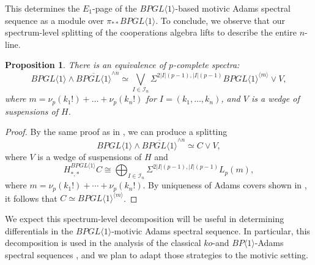 \documentclass{amsart}
\newtheorem{proposition}[theorem]{Proposition}
\theoremstyle{plain}
\numberwithin{theorem}{section}
\numberwithin{equation}{section}
\numberwithin{figure}{section}
\newcommand{\0}{\langle 0 \rangle }
\begin{document}
This determines the $E_1$-page of the $BPGL\langle 1 \rangle$-based motivic Adams spectral sequence as a module over $\pi_{**}BPGL\langle 1 \rangle$. To conclude, we observe that our spectrum-level splitting of the cooperations algebra lifts to describe the entire $n$-line.

\begin{proposition}
    There is an equivalence of $p$-complete spectra:
    \[BPGL \langle 1 \rangle \wedge \overline{BPGL \langle 1 \rangle}^{\wedge n} \simeq\bigvee_{I \in \mathcal{I}_n}\Sigma^{2|I|(p-1), |I|(p-1)}BPGL \langle 1 \rangle^{\langle m \rangle} \vee V,\]
    where $m = \nu_p(k_1!) + \dots +\nu_p(k_n!)$ for $I = (k_1, \dots, k_n)$, and $V$ is a wedge of suspensions of $H$.
\end{proposition}

\begin{proof}
    By the same proof as in , we can produce a splitting
    \[BPGL \langle 1 \rangle \wedge \overline{BPGL \langle 1 \rangle}^{\wedge n} \simeq C \vee V,\]
    where $V$ is a wedge of suspensions of $H$ and 
    \[H_{*,*}^{BPGL \langle 1 \rangle}C \cong \bigoplus_{I \in \mathcal{I}_n}\Sigma^{2|I|(p-1), |I|(p-1)}L_p(m),\]
    where $m = \nu_p(k_1!) + \cdots +\nu_p(k_n!)$. By uniqueness of Adams covers shown in , it follows that $C \simeq BPGL \langle 1 \rangle^{\langle m \rangle}$.
\end{proof}

We expect this spectrum-level decomposition will be useful in determining differentials in the $BPGL \langle 1 \rangle$-motivic Adams spectral sequence. In particular, this decomposition is used in the analysis of the classical $ko$-and $BP\langle 1 \rangle$-Adams spectral sequences \cite{BBBCX, Gonzalez00}, and we plan to adapt those strategies to the motivic setting.





\printbibliography
\end{document}
